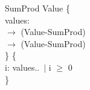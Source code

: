 \begin{myquote}
\Bsig SumProd \Bextends Value \{\\
\TA values: \Bint\\
\TB $\rightarrow$ \Blone (Value-SumProd)\\
\TB $\rightarrow$ (Value-SumProd)\\
\} \{\\
\TA \Ball i: values.\Buniv.\Buniv\ $|$ i $\geq$ 0\\
\}
\end{myquote}